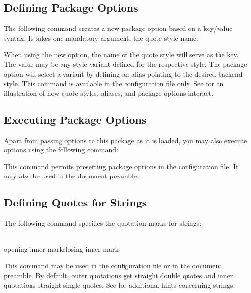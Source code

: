 \documentclass{ltxdockit}[2010/09/26]
\begin{document}
\subsection{Defining Package Options}
\label{cfg:opt}

The following command creates a new package option based on a key\slash value syntax. It takes one mandatory argument, the quote style name:

\begin{ltxsyntax}


When using the new option, the name of the quote style will serve as the key. The value may be any style variant defined for the respective style. The package option will select a variant by defining an alias pointing to the desired backend style. This command is available in the configuration file only. See  for an illustration of how quote styles, aliases, and package options interact.

\end{ltxsyntax}

\subsection{Executing Package Options}
\label{cfg:exe}

Apart from passing options to this package as it is loaded, you may also execute options using the following command:

\begin{ltxsyntax}


This command permits presetting package options in the configuration file. It may also be used in the document preamble.

\end{ltxsyntax}

\subsection{Defining Quotes for \pdf Strings}
\label{cfg:pdf}

The following command specifies the quotation marks for \pdf strings:

\begin{ltxsyntax}

\\
{opening inner mark}{closing inner mark}

This command may be used in the configuration file or in the document preamble. By default, outer quotations get straight double quotes and inner quotations straight single quotes. See  for additional hints concerning \pdf strings.

\end{ltxsyntax}
\end{document}
